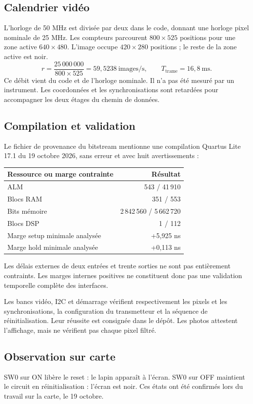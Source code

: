 \documentclass[11pt,a4paper]{article}
\begin{document}
\subsection{Calendrier vidéo}
L'horloge de 50 MHz est divisée par deux dans le code, donnant une horloge pixel nominale de 25 MHz. Les compteurs parcourent $800\times525$ positions pour une zone active $640\times480$. L'image occupe $420\times280$ positions ; le reste de la zone active est noir.
\[
 r=\frac{25\,000\,000}{800\times525}
   =59{,}5238\ \mathrm{images/s},\qquad
 T_{\mathrm{trame}}=16{,}8\ \mathrm{ms}.
\]
Ce débit vient du code et de l'horloge nominale. Il n'a pas été mesuré par un instrument. Les coordonnées et les synchronisations sont retardées pour accompagner les deux étages du chemin de données.

\subsection{Compilation et validation}
Le fichier de provenance du bitstream mentionne une compilation Quartus Lite 17.1 du 19 octobre 2026, sans erreur et avec huit avertissements :
\begin{center}
\begin{tabular}{@{}lr@{}}
\toprule
Ressource ou marge contrainte & Résultat\\
\midrule
ALM & 543 / 41\,910\\
Blocs RAM & 351 / 553\\
Bits mémoire & 2\,842\,560 / 5\,662\,720\\
Blocs DSP & 1 / 112\\
Marge setup minimale analysée & +5,925 ns\\
Marge hold minimale analysée & +0,113 ns\\
\bottomrule
\end{tabular}
\end{center}
Les délais externes de deux entrées et trente sorties ne sont pas entièrement contraints. Les marges internes positives ne constituent donc pas une validation temporelle complète des interfaces.

Les bancs vidéo, I2C et démarrage vérifient respectivement les pixels et les synchronisations, la configuration du transmetteur et la séquence de réinitialisation. Leur réussite est consignée dans le dépôt. Les photos attestent l'affichage, mais ne vérifient pas chaque pixel filtré.

\newpage
\subsection{Observation sur carte}
SW0 sur ON libère le reset : le lapin apparaît à l'écran. SW0 sur OFF maintient le circuit en réinitialisation : l'écran est noir. Ces états ont été confirmés lors du travail sur la carte, le 19 octobre.
\end{document}
